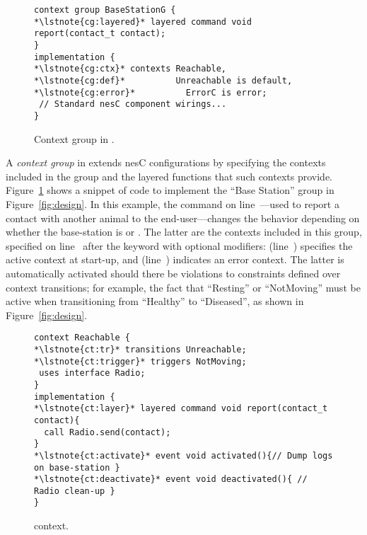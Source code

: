 \begin{figure}[!tb]
\begin{lstlisting}[style=conescframe]
context group BaseStationG {
*\lstnote{cg:layered}* layered command void report(contact_t contact);
}
implementation {
*\lstnote{cg:ctx}* contexts Reachable, 
*\lstnote{cg:def}*          Unreachable is default,
*\lstnote{cg:error}*          ErrorC is error;
 // Standard nesC component wirings... 
}
\end{lstlisting}
\vspace{-4mm}
\caption{Context group in \conesc.}
  \label{fig:configuration}
\vspace{-5mm}
\end{figure}

A \emph{context group} in \conesc extends nesC configurations
by specifying the contexts included in the group and the layered
functions that such contexts provide.  Figure~\ref{fig:configuration}
shows a snippet of \conesc code to implement the ``Base Station''
group in Figure~\ref{fig:design}. In this example, the 
command on line~---used to report a contact with
another animal to the end-user---changes the behavior depending on
whether the base-station is  or
. The latter are the contexts included in this
group, specified on line~ after the keyword
 with optional modifiers: 
(line~) specifies the active context at start-up, and
 (line~) indicates an error
context. The latter is automatically activated should there be
violations to constraints defined over context transitions; for
example, the fact that ``Resting'' or ``NotMoving'' must be active
when transitioning from ``Healthy'' to ``Diseased'', as shown in
Figure~\ref{fig:design}.

\begin{figure}[!tb]
\begin{lstlisting}[style=conescframe]
context Reachable {
*\lstnote{ct:tr}* transitions Unreachable;
*\lstnote{ct:trigger}* triggers NotMoving;
 uses interface Radio;
} 
implementation {
*\lstnote{ct:layer}* layered command void report(contact_t contact){
  call Radio.send(contact);
}
*\lstnote{ct:activate}* event void activated(){// Dump logs on base-station }
*\lstnote{ct:deactivate}* event void deactivated(){ // Radio clean-up }
}
\end{lstlisting}
\vspace{-4mm}
\caption{\conesc context.}
  \label{fig:context}
\vspace{-7mm}
\end{figure}

